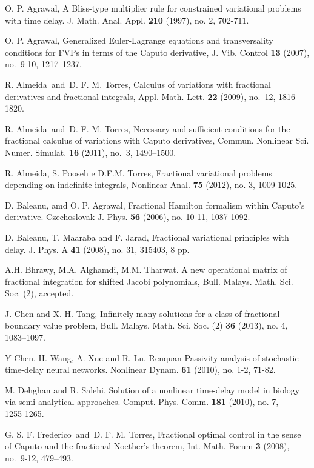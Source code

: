 \documentclass[10pt]{article}
\begin{document}
\begin{thebibliography}{99}

O. P. Agrawal,
A Bliss-type multiplier rule for constrained variational problems with time delay.
J. Math. Anal. Appl. {\bf 210} (1997), no. 2, 702-711.

O. P. Agrawal,
Generalized Euler-Lagrange equations and transversality
conditions for FVPs in terms of the Caputo derivative,
J. Vib. Control {\bf 13} (2007), no.~9-10, 1217--1237.

R. Almeida\ and\ D. F. M. Torres,
Calculus of variations with fractional
derivatives and fractional integrals,
Appl. Math. Lett. {\bf 22} (2009), no.~12, 1816--1820.

R. Almeida\ and\ D. F. M. Torres,
Necessary and sufficient conditions for the fractional calculus
of variations with Caputo derivatives,
Commun. Nonlinear Sci. Numer. Simulat. {\bf 16} (2011), no.~3, 1490--1500.

R. Almeida, S. Pooseh e D.F.M. Torres,
Fractional variational problems depending on indefinite integrals,
Nonlinear Anal. {\bf 75} (2012), no. 3, 1009-1025.

D. Baleanu, amd O. P. Agrawal,
Fractional Hamilton formalism within Caputo's derivative.
Czechoslovak J. Phys.  {\bf 56} (2006), no. 10-11, 1087-1092.

D. Baleanu, T. Maaraba and F. Jarad,
Fractional variational principles with delay.
J. Phys. A {\bf 41} (2008), no. 31, 315403, 8 pp.

A.H. Bhrawy, M.A. Alghamdi, M.M. Tharwat. A new operational matrix of fractional integration for shifted Jacobi polynomials, 
Bull. Malays. Math. Sci. Soc. (2), accepted.

J. Chen and X. H. Tang, 
Infinitely many solutions for a class of fractional boundary value problem,
Bull. Malays. Math. Sci. Soc. (2)  {\bf 36}  (2013),  no. 4, 1083--1097.

Y Chen, H. Wang, A. Xue and R. Lu,
Renquan Passivity analysis of stochastic time-delay neural networks.
Nonlinear Dynam. {\bf 61} (2010), no. 1-2, 71-82.


M. Dehghan and R. Salehi,
Solution of a nonlinear time-delay model in biology via semi-analytical approaches.
Comput. Phys. Comm. {\bf 181} (2010), no. 7, 1255-1265.

G. S. F. Frederico\ and\ D. F. M. Torres,
Fractional optimal control in the sense of Caputo
and the fractional Noether's theorem,
Int. Math. Forum {\bf 3} (2008), no.~9-12, 479--493.


\end{thebibliography}
\end{document}
